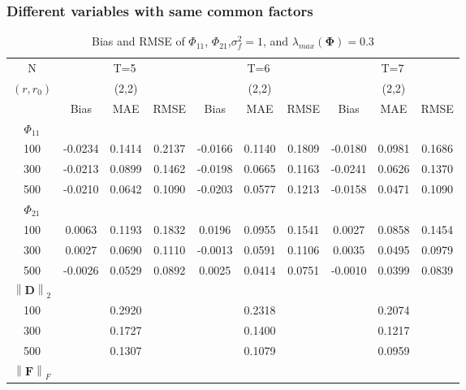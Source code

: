 \documentclass[12pt,a4paper,hyperref]{article}
\begin{document}
\subsubsection{Different variables with same common factors}
\begin{table}[H]
\caption{Bias and RMSE of $\Phi_{11}$, $\Phi_{21}$,$\sigma^{2}_{f}=1$,  and $\lambda_{max}(\boldsymbol{\Phi})=0.3$}
\centering
\tabcolsep=0.11cm
\begin{threeparttable}
\begin{tabular} {*{10}{c}}
\toprule
N& \multicolumn{3}{c}{T=5}&\multicolumn{3}{c}{T=6}&\multicolumn{3}{c}{T=7}\\
\cmidrule(lr){1-10}
$(r,r_{0})$ &   &(2,2)  &  &   &(2,2)  & &  &(2,2) & \\
\cmidrule(lr){1-4} \cmidrule(lr){5-7}\cmidrule(lr){8-10}
& \multicolumn{1}{c}{Bias} &\multicolumn{1}{c}{MAE}& \multicolumn{1}{c}{RMSE}&\multicolumn{1}{c}{Bias} &\multicolumn{1}{c}{MAE}& \multicolumn{1}{c}{RMSE}&\multicolumn{1}{c}{Bias}&\multicolumn{1}{c}{MAE} & \multicolumn{1}{c}{RMSE}\\
  \cmidrule(lr){2-4} \cmidrule(lr){5-7} \cmidrule(lr){8-10}
 $\Phi_{11}$\\
\cmidrule(lr){1-10}
 100& -0.0234&0.1414 &0.2137 & -0.0166& 0.1140& 0.1809& -0.0180&0.0981 & 0.1686\\
300& -0.0213& 0.0899&0.1462 & -0.0198 &0.0665 &0.1163 &-0.0241&0.0626&0.1370\\
500& -0.0210& 0.0642&0.1090 & -0.0203 &0.0577 & 0.1213&-0.0158 & 0.0471&0.1090 \\
\cmidrule(lr){1-10}
$\Phi_{21}$\\
\cmidrule(lr){1-4}   \cmidrule(lr){5-7}   \cmidrule(lr){8-10}
100&0.0063 & 0.1193& 0.1832& 0.0196& 0.0955&0.1541&0.0027&0.0858 & 0.1454\\
300& 0.0027& 0.0690& 0.1110&-0.0013  &0.0591& 0.1106& 0.0035& 0.0495&0.0979\\
500& -0.0026& 0.0529& 0.0892&0.0025 & 0.0414&0.0751 &-0.0010& 0.0399&0.0839 \\
\cmidrule(lr){1-10}
$\left\| \boldsymbol{D} \right\|_{2} $\\
\cmidrule(lr){1-4}   \cmidrule(lr){5-7}   \cmidrule(lr){8-10}
100& &0.2920 & &  &0.2318& & & 0.2074& \\
300& & 0.1727& &  & 0.1400& & &0.1217&\\
500& & 0.1307& &  &0.1079& & &0.0959 & \\
\cmidrule(lr){1-10}
$\left\| \boldsymbol{F} \right\|_{F} $\\

\end{tabular}
\end{threeparttable}
\end{table}
\end{document}
